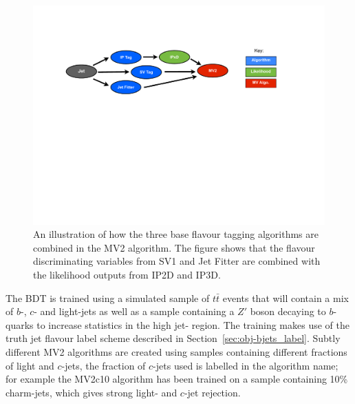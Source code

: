 \begin{figure}[!htb]
  \begin{center}
    \includegraphics[width=1.0\textwidth]{figs/Objects/MV2_schem.pdf}
    \caption[An illustration of how the three base flavour tagging algorithms are combined in the MV2 algorithm.]
            {An illustration of how the three base flavour tagging algorithms are combined in the MV2 algorithm.
              The figure shows that the flavour discriminating variables from SV1 and Jet Fitter are combined with the likelihood outputs from IP2D and IP3D.}
    \label{fig:obj-MV2_schem}
  \end{center}
  \vspace{-1em}
\end{figure}

The BDT is trained using a simulated sample of $t\bar{t}$ events that will contain a mix of  $b$-, $c$- and light-jets
as well as a sample containing a $Z'$ boson decaying to $b$-quarks to increase statistics in the high jet-\pT{} region.
The training makes use of the truth jet flavour label scheme described in Section~\ref{sec:obj-bjets_label}.
Subtly different MV2 algorithms are created using samples containing different fractions of light and $c$-jets,
the fraction of $c$-jets used is labelled in the algorithm name;
for example the MV2c10 algorithm has been trained on a sample containing 10\% charm-jets, which gives strong light- and $c$-jet rejection.

